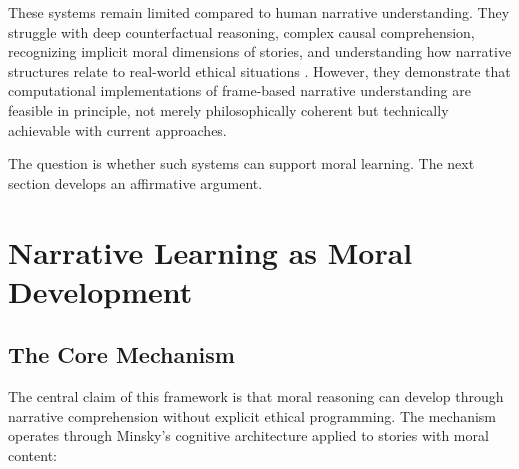 \documentclass[12pt]{article}
\begin{document}
These systems remain limited compared to human narrative understanding. They struggle with deep counterfactual reasoning, complex causal comprehension, recognizing implicit moral dimensions of stories, and understanding how narrative structures relate to real-world ethical situations \citep{sap2019socialiqa, forbes2020social}. However, they demonstrate that computational implementations of frame-based narrative understanding are feasible in principle, not merely philosophically coherent but technically achievable with current approaches.

The question is whether such systems can support moral learning. The next section develops an affirmative argument.

\section{Narrative Learning as Moral Development}

\subsection{The Core Mechanism}

The central claim of this framework is that moral reasoning can develop through narrative comprehension without explicit ethical programming. The mechanism operates through Minsky's cognitive architecture applied to stories with moral content:
\end{document}
